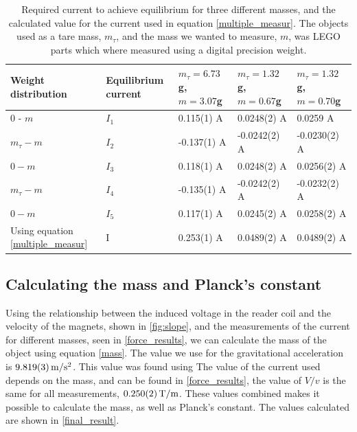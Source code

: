 \documentclass[english,a4paper,12pt,reprint]{revtex4-1}
\begin{document}
\begin{table}
\centering
\caption{Required current to achieve equilibrium for three different masses, and the calculated value for the current used in equation \eqref{multiple_measur}. The objects used as a tare mass, $m_\tau$, and the mass we wanted to measure, $m$, was LEGO parts which where measured using a digital precision weight.}
\label{force_results}
\begin{tabular}{@{}lllll@{}}
\toprule
Weight distribution & Equilibrium current & $m_\tau = 6.73$g, $m=3.07$g & $m_\tau = 1.32$g, $m=0.67$g & $m_\tau = 1.32$g, $m=0.70$g \\ \midrule
0 - $m$  & $I_1$           & 0.115(1) A                    & 0.0248(2) A                    & 0.0259 A                    \\
$m_\tau - m$   & $I_2$     & -0.137(1) A                   & -0.0242(2) A                   & -0.0230(2) A                   \\
$0 - m$      & $I_3$        & 0.118(1) A                    & 0.0248(2) A                   & 0.0256(2) A                    \\
$m_\tau - m$  & $I_4$       & -0.135(1) A                   & -0.0242(2) A                   & -0.0232(2) A                   \\
$0-m$        &$I_5$       & 0.117(1) A                    & 0.0245(2) A                    & 0.0258(2) A    \\ \midrule Using equation \eqref{multiple_measur} & I & 0.253(1) A & 0.0489(2) A & 0.0489(2) A \\ \bottomrule
\end{tabular}
\end{table}

\subsection{Calculating the mass and Planck's constant}
Using the relationship between the induced voltage in the reader coil and the velocity of the magnets, shown in \eqref{fig:slope}, and the measurements of the current for different masses, seen in \vref{force_results}, we can calculate the mass of the object using equation \eqref{mass}. The value we use for the gravitational acceleration is $\SI{9.819\pm0.003}{\meter/\second^2}$. This value was found using The value of the current used depends on the mass, and can be found in \vref{force_results}, the value of $V/v$ is the same for all measurements, $\SI{0.250\pm0.002}{\tesla/\meter}$. These values combined makes it possible to calculate the mass, as well as Planck's constant. The values calculated are shown in \vref{final_result}. %
\end{document}

